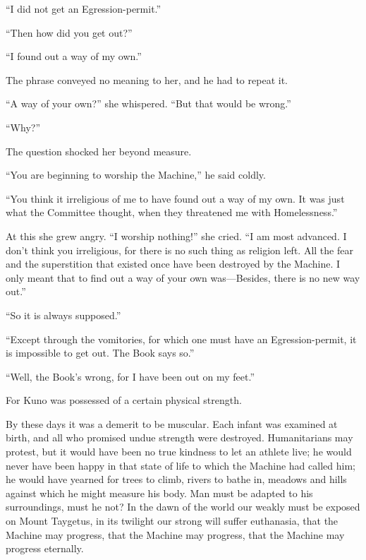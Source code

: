 ``I did not get an Egression-permit.''

``Then how did you get out?''

``I found out a way of my own.''

The phrase conveyed no meaning to her, and he had to repeat it.

``A way of your own?'' she whispered. ``But that would be wrong.''

``Why?''

The question shocked her beyond measure.

``You are beginning to worship the Machine,'' he said coldly.

``You think it irreligious of me to have found out a way of my own. It was just what the Committee thought, when they threatened me with Homelessness.''

At this she grew angry. ``I worship nothing!'' she cried. ``I am most advanced. I don't think you irreligious, for there is no such thing as religion left. All the fear and the superstition that existed once have been destroyed by the Machine. I only meant that to find out a way of your own was---Besides, there is no new way out.''

``So it is always supposed.''

``Except through the vomitories, for which one must have an Egression-permit, it is impossible to get out. The Book says so.''

``Well, the Book's wrong, for I have been out on my feet.''

For Kuno was possessed of a certain physical strength.

By these days it was a demerit to be muscular. Each infant was examined at birth, and all who promised undue strength were destroyed. Humanitarians may protest, but it would have been no true kindness to let an athlete live; he would never have been happy in that state of life to which the Machine had called him; he would have yearned for trees to climb, rivers to bathe in, meadows and hills against which he might measure his body. Man must be adapted to his surroundings, must he not? In the dawn of the world our weakly must be exposed on Mount Taygetus, in its twilight our strong will suffer euthanasia, that the Machine may progress, that the Machine may progress, that the Machine may progress eternally.

